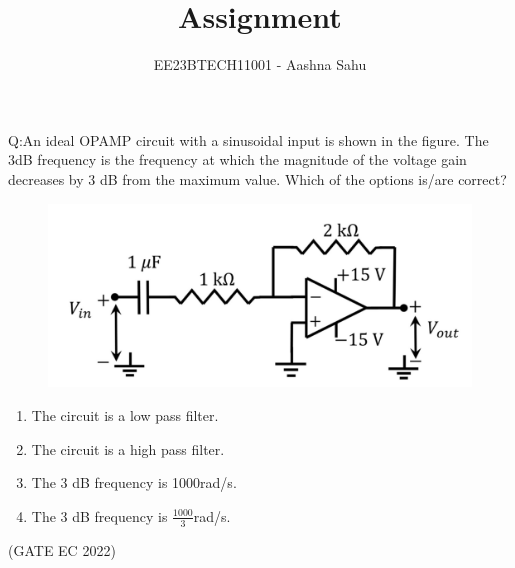 \documentclass[journal,12pt,twocolumn]{IEEEtran}
\theoremstyle{remark}
\begin{document}
\let\vec\mathbf



\vspace{3cm}
\title{Assignment}
\author{EE23BTECH11001 - Aashna Sahu}
\maketitle
\bigskip

\renewcommand{\thefigure}{\theenumi}
\renewcommand{\thetable}{\theenumi}

Q:An ideal OPAMP circuit with a sinusoidal input is shown in the figure. The 3dB frequency is the frequency at which the magnitude of the voltage gain decreases by 3 dB from the maximum value. Which of the options is/are correct?

\begin{figure}[H]
  \centering
  \includegraphics[width=1.0\columnwidth]{figs/qfig.png}
  \label{fig:fig1}
\end{figure}

\begin{enumerate}[label=(\Alph*)]
\item The circuit is a low pass filter.\\
\item The circuit is a high pass filter.\\
\item The 3 dB frequency is 1000rad/s.\\
\item The 3 dB frequency is $\frac{1000}{3}$rad/s.\\
\end{enumerate}
\hfill(GATE EC 2022)

\solution
\end{document}

